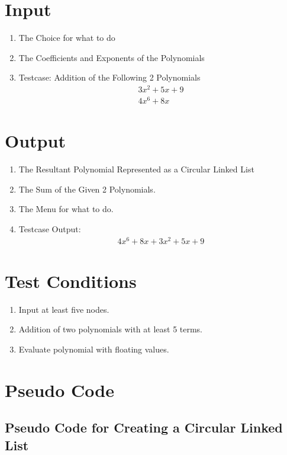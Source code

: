 \documentclass[11pt]{article}
\begin{document}
\section{Input}
\begin{enumerate}
	\item The Choice for what to do
	\item The Coefficients and Exponents of the Polynomials
	\item Testcase: Addition of the Following 2 Polynomials
	      \begin{eqnarray}
		      3x^2 + 5x + 9\\
		      4x^6 + 8x
	      \end{eqnarray}
\end{enumerate}
\section{Output}
\begin{enumerate}
	\item The Resultant Polynomial Represented as a Circular Linked List
	\item The Sum of the Given 2 Polynomials.
	\item The Menu for what to do.
	\item Testcase Output:
	      \begin{eqnarray}
		      4x^6 + 8x + 3x^2 + 5x + 9
	      \end{eqnarray}
\end{enumerate}

\section{Test Conditions}
\begin{enumerate}
	\item Input at least five nodes.
	\item Addition of two polynomials with at least 5 terms.
	\item Evaluate polynomial with floating values.
\end{enumerate}

\section{Pseudo Code}
\subsection{Pseudo Code for Creating a Circular Linked List}
\end{document}
